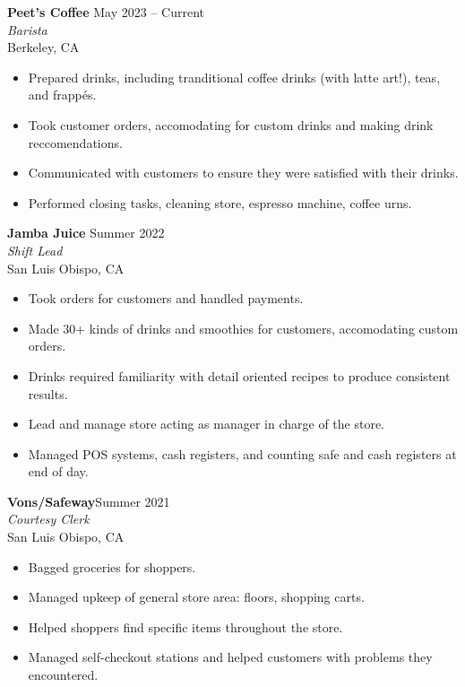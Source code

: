 \documentclass[11pt]{article}
\begin{document}
    \begin{adjustwidth}{1em}{1em}


    \textbf{Peet's Coffee} \hfill May 2023 -- Current
    \\\textit{Barista}
    \\ Berkeley, CA
    \begin{itemize}
        \item Prepared drinks, including tranditional coffee drinks (with latte art!), teas, and frappés.
        \item Took customer orders, accomodating for custom drinks and making drink reccomendations.
        \item Communicated with customers to ensure they were satisfied with their drinks.
        \item Performed closing tasks, cleaning store, espresso machine, coffee urns.
    \end{itemize}

    \vspace{5mm}

    \textbf{Jamba Juice} \hfill Summer 2022
    \\\textit{Shift Lead}
    \\San Luis Obispo, CA
    \begin{itemize}
        \item Took orders for customers and handled payments.
        \item Made 30+ kinds of drinks and smoothies for customers, accomodating custom orders.
        \item Drinks required familiarity with detail oriented recipes to produce consistent results.
        \item Lead and manage store acting as manager in charge of the store.
        \item Managed POS systems, cash registers, and counting safe and cash registers at end of day.
    \end{itemize}

    \vspace{5mm}

    \textbf{Vons/Safeway}\hfill Summer 2021
    \\ \textit{Courtesy Clerk} 
    \\San Luis Obispo, CA
    \begin{itemize}
        \item Bagged groceries for shoppers.
        \item Managed upkeep of general store area: floors, shopping carts.
        \item Helped shoppers find specific items throughout the store.
        \item Managed self-checkout stations and helped customers with problems they encountered.
    \end{itemize}


\end{adjustwidth}
\end{document}

